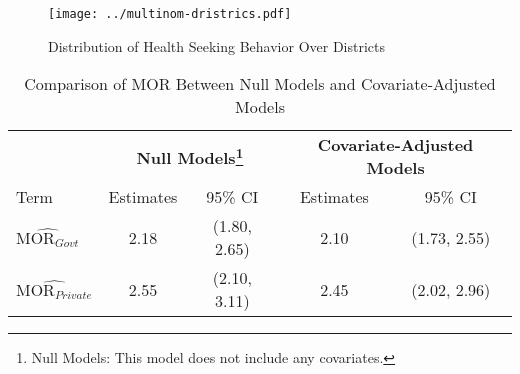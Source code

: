 \documentclass[
  letterpaper,
  DIV=11,
  numbers=noendperiod]{scrartcl}
\begin{document}
\newpage

\begin{figure}[H]

{\centering \texttt{[image: ../multinom-dristrics.pdf]}

}

\caption{Distribution of Health Seeking Behavior Over Districts}

\end{figure}%

\newpage

\begin{table}[htbp]
\centering
\caption{Comparison of MOR Between Null Models and Covariate-Adjusted Models}
\label{tab:mord_comparison}
\begin{tabular}{@{}lcccc@{}}
\toprule
 & \multicolumn{2}{c}{\textbf{Null Models\footnote{Null Models: This model does not include any covariates.}}} & \multicolumn{2}{c}{\textbf{Covariate-Adjusted Models}} \\
 \cmidrule(lr){2-3} \cmidrule(lr){4-5}
Term & Estimates & 95\% CI & Estimates & 95\% CI \\ 
\midrule
$\widehat{\mbox{MOR}_{Govt}}$ & 2.18 & (1.80, 2.65) & 2.10 & (1.73, 2.55) \\
$\widehat{\mbox{MOR}_{Private}}$ & 2.55 & (2.10, 3.11) & 2.45 & (2.02, 2.96) \\
\bottomrule
\end{tabular}
\scriptsize
{}
\end{table}
\end{document}
